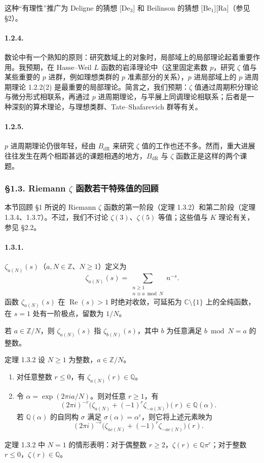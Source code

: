 这种“有理性”推广为 Deligne 的猜想 [De$_3$] 和 Beilinson 的猜想 [Be$_1$][Ra]（参见 §2）。

\paragraph{1.2.4.}
数论中有一个熟知的原则：研究数域上的对象时，局部域上的局部理论起着重要作用。我预期，在 Hasse--Weil $L$ 函数的岩泽理论中（这里固定素数 $p$，研究 $\zeta$ 值与某些重要的 $p$ 进群，例如理想类群的 $p$ 准素部分的关系），$p$ 进局部域上的 $p$ 进周期理论 1.2.2(2) 是最重要的局部理论。简言之，我们预期：$\zeta$ 值通过周期积分理论与微分形式相联系，再通过 $p$ 进周期理论，与平展上同调理论相联系；后者是一种深刻的算术理论，与理想类群、Tate--Shafarevich 群等有关。

\paragraph{1.2.5.}
$p$ 进周期理论仍很年轻，经由 $B_{\mathrm{dR}}$ 来研究 $\zeta$ 值的工作也还不多。然而，重大进展往往发生在两个相距甚远的课题相遇的地方，$B_{\mathrm{dR}}$ 与 $\zeta$ 函数正是这样的两个课题。

\subsubsection*{§1.3. Riemann $\zeta$ 函数若干特殊值的回顾}
本节回顾 §1 所说的 Riemann $\zeta$ 函数的第一阶段（定理 1.3.2）和第二阶段（定理 1.3.4、1.3.7）。不过，我们不讨论 $\zeta(3)$、$\zeta(5)$ 等值；这些值与 $K$ 理论有关，参见 §2.2。

\paragraph{1.3.1.}
 $\zeta_{a(N)}(s)$（$a,N\in\mathbb Z$、$N\geq1$）定义为
\[
\zeta_{a(N)}(s)=\sum_{\substack{n\geq1\\n\equiv a\bmod N}}n^{-s}.
\]
函数 $\zeta_{a(N)}(s)$ 在 $\operatorname{Re}(s)>1$ 时绝对收敛，可延拓为 $\mathbb C\setminus\{1\}$ 上的全纯函数，在 $s=1$ 处有一阶极点，留数为 $1/N$。

若 $a\in\mathbb Z/N$，则 $\zeta_{a(N)}(s)$ 指 $\zeta_{b(N)}(s)$，其中 $b$ 为任意满足 $b\bmod N=a$ 的整数。

\begin{statement}{定理 1.3.2}
设 $N\geq1$ 为整数，$a\in\mathbb Z/N$。
\begin{enumerate}[label=(\arabic*)]
\item 对任意整数 $r\leq0$，有 $\zeta_{a(N)}(r)\in\mathbb Q$。
\item 令 $\alpha=\exp(2\pi ia/N)$。则对任意 $r\geq1$，有
\[
(2\pi i)^{-r}\bigl(\zeta_{a(N)}+(-1)^r\zeta_{-a(N)}\bigr)(r)
\in\mathbb Q(\alpha).
\]
若 $\mathbb Q(\alpha)$ 的自同构 $\sigma$ 满足 $\sigma(\alpha)=\alpha^c$，则它将上述元素映为
\[
(2\pi i)^{-r}\bigl(\zeta_{ac(N)}+(-1)^r\zeta_{-ac(N)}\bigr)(r).
\]
\end{enumerate}
\end{statement}
定理 1.3.2 中 $N=1$ 的情形表明：对于偶整数 $r\geq2$，$\zeta(r)\in\mathbb Q\pi^r$；对于整数 $r\leq0$，$\zeta(r)\in\mathbb Q$。

